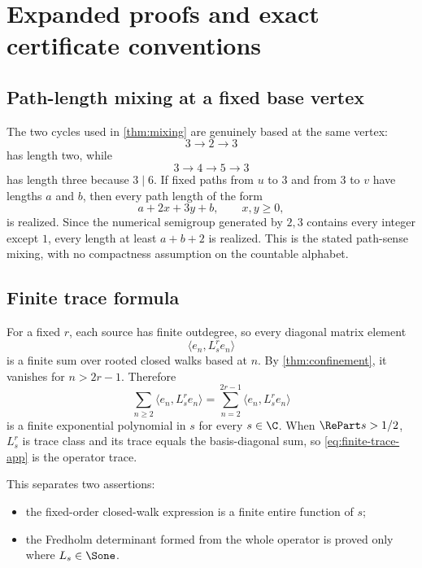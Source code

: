\section{Expanded proofs and exact certificate conventions}
\label{app:proofs}

\subsection{Path-length mixing at a fixed base vertex}

The two cycles used in \cref{thm:mixing} are genuinely based at the same
vertex:
\[
 3\to2\to3
\]
has length two, while
\[
 3\to4\to5\to3
\]
has length three because \(3\mid6\).  If fixed paths from \(u\) to \(3\) and
from \(3\) to \(v\) have lengths \(a\) and \(b\), then every path length of
the form
\[
 a+2x+3y+b,\qquad x,y\ge0,
\]
is realized.  Since the numerical semigroup generated by \(2,3\) contains
every integer except \(1\), every length at least \(a+b+2\) is realized.
This is the stated path-sense mixing, with no compactness assumption on the
countable alphabet.

\subsection{Finite trace formula}

For a fixed \(r\), each source has finite outdegree, so every diagonal matrix
element
\[
 \langle e_n,L_s^re_n\rangle
\]
is a finite sum over rooted closed walks based at \(n\).  By
\cref{thm:confinement}, it vanishes for \(n>2r-1\).  Therefore
\begin{equation}
\label{eq:finite-trace-app}
 \sum_{n\ge2}\langle e_n,L_s^re_n\rangle
 =
 \sum_{n=2}^{2r-1}\langle e_n,L_s^re_n\rangle
\end{equation}
is a finite exponential polynomial in \(s\) for every \(s\in\C\).
When \(\RePart s>1/2\), \(L_s^r\) is trace class and its trace equals the
basis-diagonal sum, so \cref{eq:finite-trace-app} is the operator trace.

This separates two assertions:

\begin{itemize}
  \item the fixed-order closed-walk expression is a finite entire function of
  \(s\);
  \item the Fredholm determinant formed from the whole operator is proved only
  where \(L_s\in\Sone\).
\end{itemize}

